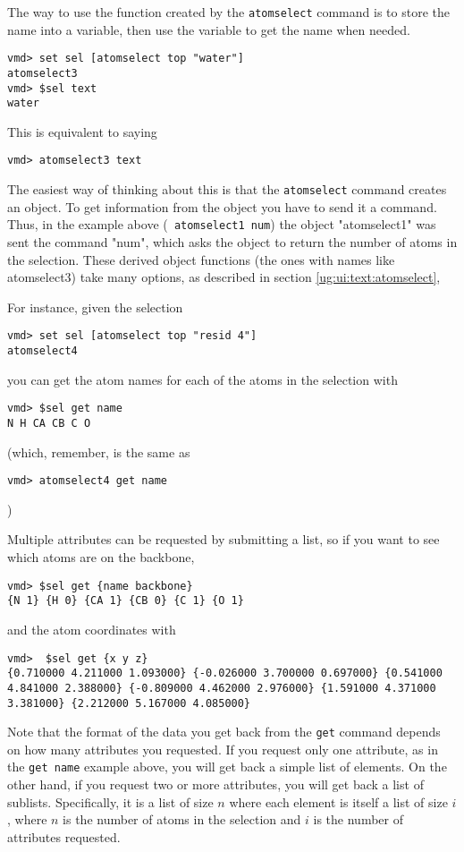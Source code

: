   The way to use the function created by the {\tt atomselect} command
is to store the name into a variable, then use the variable to get the
name when needed.
\begin{verbatim}
vmd> set sel [atomselect top "water"]
atomselect3
vmd> $sel text
water
\end{verbatim}
This is equivalent to saying
\begin{verbatim}
vmd> atomselect3 text
\end{verbatim}

The easiest way of thinking about this is that the {\tt atomselect}
command creates an object.  To get information from the object you
have to send it a command.  Thus, in the example above ({\tt
atomselect1 num}) the object "atomselect1" was sent the command "num",
which asks the object to return the number of atoms in the selection.
These derived object functions (the ones with names like atomselect3)
take many options, as described in 
section \ref{ug:ui:text:atomselect},

For instance, given the selection
\begin{verbatim}
vmd> set sel [atomselect top "resid 4"]
atomselect4
\end{verbatim}
you can get the atom names for each of the atoms in the selection with
\begin{verbatim}
vmd> $sel get name
N H CA CB C O
\end{verbatim}
  (which, remember, is the same as
\begin{verbatim}
vmd> atomselect4 get name
\end{verbatim}
)

Multiple attributes can be requested by submitting a list, so if you
want to see which atoms are on the backbone,
\begin{verbatim}
vmd> $sel get {name backbone}
{N 1} {H 0} {CA 1} {CB 0} {C 1} {O 1}
\end{verbatim}

and the atom coordinates with
\begin{verbatim}
vmd>  $sel get {x y z}
{0.710000 4.211000 1.093000} {-0.026000 3.700000 0.697000} {0.541000
4.841000 2.388000} {-0.809000 4.462000 2.976000} {1.591000 4.371000
3.381000} {2.212000 5.167000 4.085000}
\end{verbatim}

Note that the format of the data you get back from the {\tt get} command
depends on how many attributes you requested.  If you request only one
attribute, as in the {\tt get name} example above, you will get back
a simple list of elements.  On the other hand, if you request two or
more attributes, you will get back a list of sublists.  Specifically,
it is a list of size $n$ where each element is itself a list of size $i$,
where $n$ is the number of atoms in the selection and $i$ is the number
of attributes requested.

